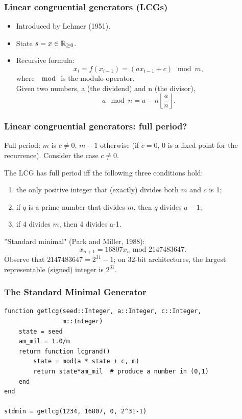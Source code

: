 \documentclass{beamer}
\begin{document}
	\begin{frame}
		\frametitle{Linear congruential generators (LCGs)}
		
\begin{itemize}
\item
Introduced by Lehmer (1951).
\item
State $s = x \in {\mathbb{R}}_{\geq 0}$.
\item
Recursive formula:
$$
x_i = f(x_{i-1}) = (ax_{i-1}+c) \mod m,
$$
where $\mod$ is the modulo operator.\\
Given two numbers, a (the dividend) and n (the divisor),
$$
a \mod n = a - n\left\lfloor \frac{a}{n} \right\rfloor.
$$
\end{itemize}
		
\end{frame}
	
	\begin{frame}
		\frametitle{Linear congruential generators: full period?}
		
		Full period: $m$ is $c \ne 0$, $m-1$ otherwise (if $c = 0$, 0 is a
		fixed point for the recurrence).
		Consider the case $c \ne 0$.
		
		\begin{theorem}[Period]
			The LCG has full period iff the
			following three conditions hold:
			\begin{enumerate}
				\item
				the only positive integer that (exactly) divides both $m$ and $c$ is
				1;
				\item
				if $q$ is a prime number that divides $m$, then $q$ divides $a-1$;
				\item
				if 4 divides $m$, then 4 divides a-1.
			\end{enumerate}
		\end{theorem}
		''{\red Standard minimal}" (Park and Miller, 1988):
		\[
		x_{n+1} = 16807x_n \mbox{ mod } 2147483647.
		\]
		Observe that $2147483647 = 2^{31}-1$; on 32-bit architectures, the
		largest representable (signed) integer is $2^{31}$.
		
	\end{frame}
	
	\begin{frame}[containsverbatim]
		\frametitle{The Standard Minimal Generator}
		
		\begin{small}
			\begin{verbatim}
function getlcg(seed::Integer, a::Integer, c::Integer,
                m::Integer)
    state = seed
    am_mil = 1.0/m
    return function lcgrand()
        state = mod(a * state + c, m)
        return state*am_mil  # produce a number in (0,1)
    end
end

stdmin = getlcg(1234, 16807, 0, 2^31-1)
		\end{verbatim}
		\end{small}
		
	\end{frame}
	
\end{document}
